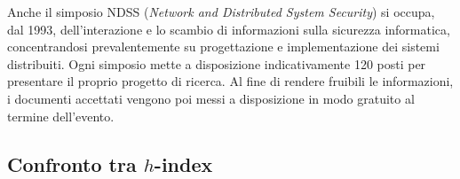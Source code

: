 Anche il simposio NDSS (\textit{Network and Distributed System Security}) si occupa, dal 1993, dell'interazione e lo scambio di informazioni sulla sicurezza informatica, concentrandosi prevalentemente su progettazione e implementazione dei sistemi distribuiti. Ogni simposio mette a disposizione indicativamente 120 posti per presentare il proprio progetto di ricerca. Al fine di rendere fruibili le informazioni, i documenti accettati vengono poi messi a disposizione in modo gratuito al termine dell'evento.

\subsection{Confronto tra $h$-index}